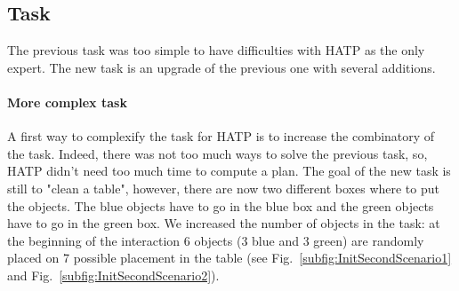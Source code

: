 \documentclass[english,a4paper,11pt,twoside]{StyleThese}
\begin{document}
\subsection{Task}

The previous task was too simple to have difficulties with HATP as the only expert. The new task is an upgrade of the previous one with several additions.


\paragraph{More complex task}

A first way to complexify the task for HATP is to increase the combinatory of the task. Indeed, there was not too much ways to solve the previous task, so, HATP didn't need too much time to compute a plan. The goal of the new task is still to "clean a 
table", however, there are now two different boxes where to put the objects. The blue objects have to go in the blue box and the green objects have to go in the green box. We increased the number of objects in the task: at the beginning of the interaction 6 objects (3 blue and 3 green) are randomly placed on 7 possible placement in the table (see Fig.~\ref{subfig:InitSecondScenario1} and Fig.~\ref{subfig:InitSecondScenario2}). 
\end{document}
